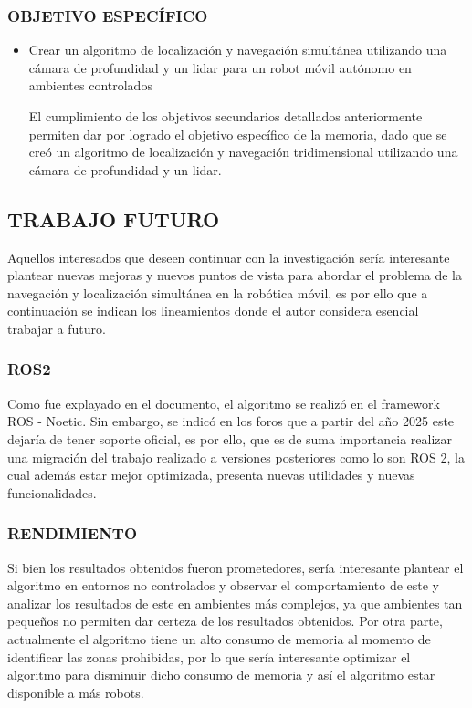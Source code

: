 \subsubsection{OBJETIVO ESPECÍFICO}
\begin{itemize}
    \item Crear un algoritmo de localización y navegación simultánea utilizando una cámara de profundidad y un lidar para un robot móvil autónomo en ambientes controlados

    El cumplimiento de los objetivos secundarios detallados anteriormente permiten dar por logrado el objetivo específico de la memoria, dado que se creó un algoritmo de localización y navegación tridimensional utilizando una cámara de profundidad y un lidar. 
    
\end{itemize}


\subsection{TRABAJO FUTURO}
Aquellos interesados que deseen continuar con la investigación sería interesante plantear nuevas mejoras y nuevos puntos de vista para abordar el problema de la navegación y localización simultánea en la robótica móvil, es por ello que a continuación se indican los lineamientos donde el autor considera esencial trabajar a futuro.

\subsubsection{ROS2}
Como fue explayado en el documento, el algoritmo se realizó en el framework ROS - Noetic. Sin embargo, se indicó en los foros que a partir del año 2025 este dejaría de tener soporte oficial, es por ello, que es de suma importancia realizar una migración del trabajo realizado a versiones posteriores como lo son ROS 2, la cual además estar mejor optimizada, presenta nuevas utilidades y nuevas funcionalidades.

\subsubsection{RENDIMIENTO}
Si bien los resultados obtenidos fueron prometedores, sería interesante plantear el algoritmo en entornos no controlados y observar el comportamiento de este y analizar los resultados de este en ambientes más complejos, ya que ambientes tan pequeños no permiten dar certeza de los resultados obtenidos. Por otra parte, actualmente el algoritmo tiene un alto consumo de memoria al momento de identificar las zonas prohibidas, por lo que sería interesante optimizar el algoritmo para disminuir dicho consumo de memoria y así el algoritmo estar disponible a más robots.

